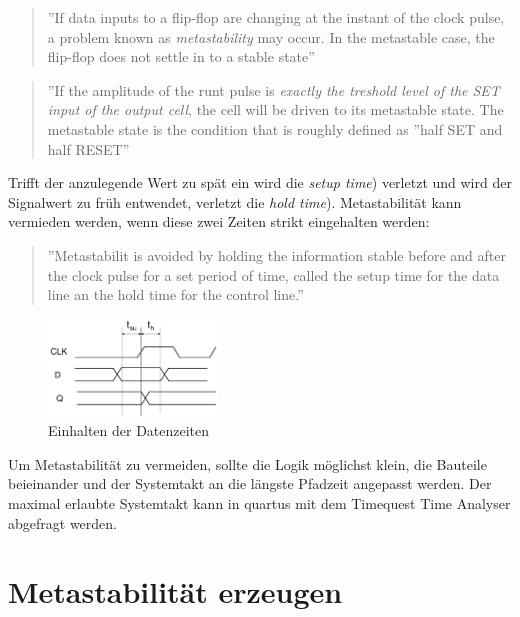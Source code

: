 \begin{quote}
''If data inputs to a flip-flop are changing at the instant of the clock pulse, a problem known as \textit{metastability} may occur. In the metastable case, the flip-flop does not settle in to a stable state'' \cite{ReferenceManual}
\end{quote}

\begin{quote}
''If the amplitude of the runt pulse is \textit{exactly the treshold level of the SET input of the output cell}, the cell will be driven to its metastable state. The metastable state is the condition that is roughly defined as ''half SET and half RESET'' \cite{F_metastability}
\end{quote}

Trifft der anzulegende Wert zu spät ein wird die \textit{setup time}) verletzt und wird der Signalwert zu früh entwendet, verletzt die \textit{hold time}). Metastabilität kann vermieden werden, wenn diese zwei Zeiten strikt eingehalten werden:

\begin{quote}
''Metastabilit is avoided by holding the information stable before and after the clock pulse  for a set period of time, called the setup time for the data line an the hold time for the control line.''\cite{ReferenceManual}
\end{quote}

\begin{figure}[H]
	\includegraphics[width=0.4\textwidth]{images/metastability/kritscheZeit_FF.png}
	\caption{Einhalten der Datenzeiten}
	\label{fig.metastabil.kritisches_zeitfenster}
\end{figure}

Um Metastabilität zu vermeiden, sollte die Logik möglichst klein, die Bauteile beieinander und der Systemtakt an die längste Pfadzeit angepasst werden. Der maximal erlaubte Systemtakt kann in quartus mit dem Timequest Time Analyser abgefragt werden.

\section{Metastabilität erzeugen}\label{sect.meatastabil_erzeugen}

